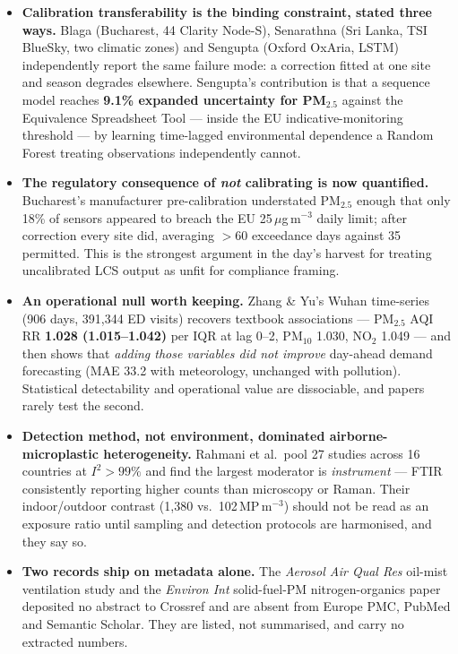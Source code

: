 \documentclass[10pt]{article}
\begin{document}
\footnotesize
\begin{itemize}
\item \textbf{Calibration transferability is the binding constraint, stated three ways.}
Blaga (Bucharest, 44 Clarity Node-S), Senarathna (Sri Lanka, TSI BlueSky, two climatic
zones) and Sengupta (Oxford OxAria, LSTM) independently report the same failure mode:
a correction fitted at one site and season degrades elsewhere. Sengupta's contribution is
that a sequence model reaches \textbf{9.1\% expanded uncertainty for PM$_{2.5}$} against
the Equivalence Spreadsheet Tool --- inside the EU indicative-monitoring threshold --- by
learning time-lagged environmental dependence a Random Forest treating observations
independently cannot.

\item \textbf{The regulatory consequence of \emph{not} calibrating is now quantified.}
Bucharest's manufacturer pre-calibration understated PM$_{2.5}$ enough that only 18\% of
sensors appeared to breach the EU 25\,$\mu$g\,m$^{-3}$ daily limit; after correction every
site did, averaging $>$60 exceedance days against 35 permitted. This is the strongest
argument in the day's harvest for treating uncalibrated LCS output as unfit for
compliance framing.

\item \textbf{An operational null worth keeping.} Zhang \& Yu's Wuhan time-series
(906 days, 391{,}344 ED visits) recovers textbook associations --- PM$_{2.5}$ AQI
RR \textbf{1.028 (1.015--1.042)} per IQR at lag 0--2, PM$_{10}$ 1.030, NO$_2$ 1.049 ---
and then shows that \emph{adding those variables did not improve} day-ahead demand
forecasting (MAE 33.2 with meteorology, unchanged with pollution). Statistical detectability
and operational value are dissociable, and papers rarely test the second.

\item \textbf{Detection method, not environment, dominated airborne-microplastic
heterogeneity.} Rahmani et al.\ pool 27 studies across 16 countries at
$I^2>99\%$ and find the largest moderator is \emph{instrument} --- FTIR consistently
reporting higher counts than microscopy or Raman. Their indoor/outdoor contrast
(1{,}380 vs.\ 102\,MP\,m$^{-3}$) should not be read as an exposure ratio until sampling
and detection protocols are harmonised, and they say so.

\item \textbf{Two records ship on metadata alone.} The \textit{Aerosol Air Qual Res}
oil-mist ventilation study and the \textit{Environ Int} solid-fuel-PM nitrogen-organics
paper deposited no abstract to Crossref and are absent from Europe PMC, PubMed and
Semantic Scholar. They are listed, not summarised, and carry no extracted numbers.


\end{itemize}
\end{document}
